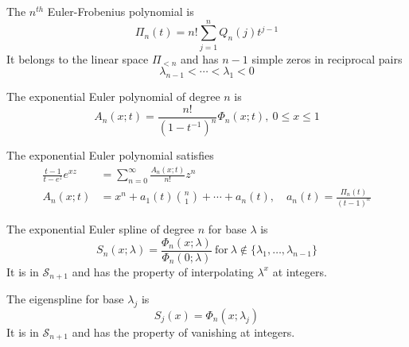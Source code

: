 \begin{deftn}\label{def:EF}
  The $n^{th}$ Euler-Frobenius polynomial is
  \begin{equation}
    \Pi_n(t) = n! \sum_{j=1}^n Q_n(j)t^{j-1}
  \end{equation}
  It belongs to the linear space $\Pi_{<n}$ and has $n-1$ simple zeros in reciprocal pairs
  \begin{equation*}
    \lambda_{n-1} < \cdots < \lambda_1 < 0
  \end{equation*}
\end{deftn}

\begin{deftn}\label{def:EE}
  The exponential Euler polynomial of degree $n$ is
  \begin{equation}
    A_n(x;t) = \frac{n!}{{(1-t^{-1})}^n} \Phi_n(x;t), \ 0\leq x\leq 1
  \end{equation}
\end{deftn}

\begin{prop}\label{prop:EF}
  The exponential Euler polynomial satisfies
  \begin{align*}
    \frac{t-1}{t-e^z}e^{xz} &= \sum_{n=0}^{\infty} \frac{A_n(x;t)}{n!}z^n \\
    A_n(x;t) &= x^n + a_1(t) \binom{n}{1} + \cdots + a_n(t), \quad a_n(t) = \frac{\Pi_n(t)}{{(t-1)}^n} \end{align*}
\end{prop}

\begin{deftn}
  The exponential Euler spline of degree $n$ for base $\lambda$ is
  \begin{equation}
    S_n(x;\lambda) = \frac{\Phi_n(x;\lambda)}{\Phi_n(0;\lambda)} \ \text{for} \ \lambda \not\in\{\lambda_1,\ldots, 
    \lambda_{n-1}\}
  \end{equation}
  It is in $\mathscr{S}_{n+1}$ and has the property of interpolating $\lambda^x$ at integers.
\end{deftn}

\begin{deftn}
  The eigenspline for base $\lambda_j$ is
  \begin{equation}
    S_j(x) = \Phi_n(x;\lambda_j)
  \end{equation}
  It is in $\mathscr{S}_{n+1}$ and has the property of vanishing at integers.
\end{deftn}

